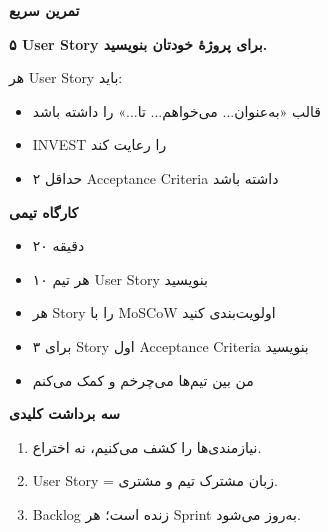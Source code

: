 \documentclass[14pt, a4paper, landscape]{extarticle}
\newcommand{\slide}[1]{%
    \newpage
    \begin{center}
    \begin{minipage}[t]{0.95\textwidth}
    \vspace{0.5cm}
    #1
    \vspace{0.5cm}
    \end{minipage}
    \end{center}
}
\newcommand{\slidetitle}[1]{%
    \begin{center}
        {\LARGE\bfseries\textcolor{primary}{#1}}
    \end{center}
    \vspace{0.5cm}
}
\begin{document}
\slide{
    \slidetitle{تمرین سریع}
    \vspace{1cm}
    \begin{center}
        {\Large\bfseries ۵ User Story برای پروژهٔ خودتان بنویسید.}
        
        \vspace{1.5cm}
        
        {\large هر User Story باید:}
        \vspace{0.3cm}
        \begin{itemize}[itemsep=0.3em]
            \item قالب «به‌عنوان... می‌خواهم... تا...» را داشته باشد
            \item INVEST را رعایت کند
            \item حداقل ۲ Acceptance Criteria داشته باشد
        \end{itemize}
    \end{center}
}

\slide{
    \slidetitle{کارگاه تیمی}
    \vspace{0.5cm}
    \begin{itemize}[itemsep=0.6em]
        \item {\large ۲۰ دقیقه}
        \item هر تیم ۱۰ User Story بنویسید
        \item هر Story را با MoSCoW اولویت‌بندی کنید
        \item برای ۳ Story اول Acceptance Criteria بنویسید
        \item من بین تیم‌ها می‌چرخم و کمک می‌کنم
    \end{itemize}
}

\slide{
    \slidetitle{سه برداشت کلیدی}
    \vspace{1cm}
    \begin{enumerate}[itemsep=0.8em]
        \item {\large نیازمندی‌ها را کشف می‌کنیم، نه اختراع.}
        \item {\large User Story = زبان مشترک تیم و مشتری.}
        \item {\large Backlog زنده است؛ هر Sprint به‌روز می‌شود.}
    \end{enumerate}
}
\end{document}
